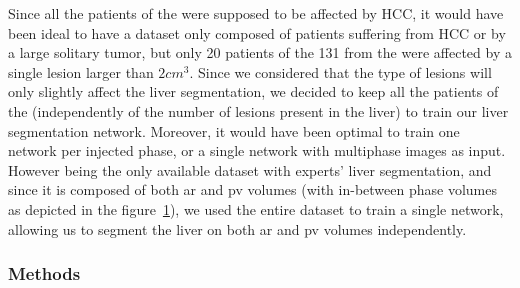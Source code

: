 {\begin{figure}[!ht]
\begin{mdframed}[backgroundcolor=blue!50,linecolor=blue!50]
{		}
		\label{fig:LitsTciaPhasePlot}
	\end{mdframed}
\end{figure}
Since all the patients of the \textbf{} were supposed to be affected by HCC, it would have been ideal to have a dataset only composed of patients suffering from HCC or by a large solitary tumor, but only 20 patients of the 131 from the \textbf{} were affected by a single lesion larger than $ 2cm^3 $.
Since we considered that the type of lesions will only slightly affect the liver segmentation, we decided to keep all the patients of the \textbf{} (independently of the number of lesions present in the liver) to train our liver segmentation network.
Moreover, it would have been optimal to train one network per injected phase, or a single network with multiphase images as input.
However \textbf{} being the only available dataset with experts' liver segmentation, and since it is composed of both \ac{ar} and \ac{pv} volumes (with in-between phase volumes as depicted in the figure \ref{fig:LitsTciaPhasePlot}), we used the entire dataset to train a single network, allowing us to segment the liver on both \ac{ar} and \ac{pv} volumes independently.
}

\subsubsection{Methods}\label{liver_segmentation_tcia_db_methods}


